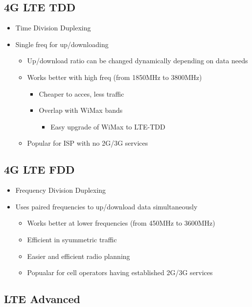 \subsection{4G LTE TDD}

\begin{itemize}
	\item Time Division Duplexing
	\item Single freq for up/downloading
	\begin{itemize}
		\item Up/download ratio can be changed dynamically depending on
			data needs
		\item Works better with high freq (from 1850MHz to 3800MHz)
		\begin{itemize}
			\item Cheaper to acces, less traffic
			\item Overlap with WiMax bands
			\begin{itemize}
				\item Easy upgrade of WiMax to LTE-TDD
			\end{itemize}
		\end{itemize}
		\item Popular for ISP with no 2G/3G services
	\end{itemize}
\end{itemize}

\subsection{4G LTE FDD}

\begin{itemize}
	\item Frequency Division Duplexing
	\item Uses paired frequencies to up/download data simultaneously
	\begin{itemize}
		\item Works better at lower frequencies (from 450MHz to 3600MHz)
		\item Efficient in syummetric traffic
		\item Easier and efficient radio planning
		\item Popualar for cell operators having established 2G/3G
			services
		\end{itemize}
\end{itemize}

\subsection{LTE Advanced}

